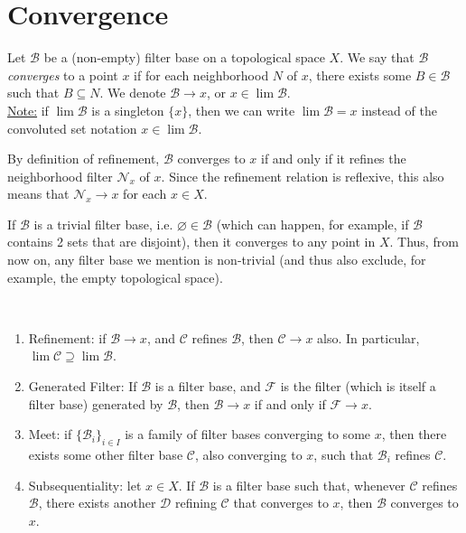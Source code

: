 \documentclass{treatise}
\begin{document}
\newpage

\section{Convergence}
Let $\mathcal{B}$ be a (non-empty) filter base on a topological space $X$. We say that $\mathcal{B}$ \emph{converges} to a point $x$ if for each neighborhood $N$ of $x$, there exists some $B \in \mathcal{B}$ such that $B \subseteq N$. We denote $\mathcal{B} \to x$, or $x \in \lim \mathcal{B}$.
\\
\underline{Note:} if $\lim \mathcal{B}$ is a singleton $\{ x \}$, then we can write $\lim \mathcal{B} = x$ instead of the convoluted set notation $x \in \lim \mathcal{B}$.
\begin{remark}
By definition of refinement, $\mathcal{B}$ converges to $x$ if and only if it refines the neighborhood filter $\mathcal{N}_x$ of $x$. Since the refinement relation is reflexive, this also means that $\mathcal{N}_x \to x$ for each $x \in X$.
\end{remark}
\begin{remark}
If $\mathcal{B}$ is a trivial filter base, i.e. $\varnothing \in \mathcal{B}$ (which can happen, for example, if $\mathcal{B}$ contains 2 sets that are disjoint), then it converges to any point in $X$. Thus, from now on, any filter base we mention is non-trivial (and thus also exclude, for example, the empty topological space).
\end{remark}
\begin{proposition} \label{conv-lat-prop} \ 
\begin{enumerate}
    \item Refinement: if $\mathcal{B} \to x$, and $\mathcal{C}$ refines $\mathcal{B}$, then $\mathcal{C} \to x$ also. In particular, $\lim \mathcal{C} \supseteq \lim \mathcal{B}$.
    \item Generated Filter: If $\mathcal{B}$ is a filter base, and $\mathcal{F}$ is the filter (which is itself a filter base) generated by $\mathcal{B}$, then $\mathcal{B} \to x$ if and only if $\mathcal{F} \to x$.
    \item Meet: if $\{ \mathcal{B}_i \}_{i \in I}$ is a family of filter bases converging to some $x$, then there exists some other filter base $\mathcal{C}$, also converging to $x$, such that $\mathcal{B}_i$ refines $\mathcal{C}$.
    \item Subsequentiality: let $x \in X$. If $\mathcal{B}$ is a filter base such that, whenever $\mathcal{C}$ refines $\mathcal{B}$, there exists another $\mathcal{D}$ refining $\mathcal{C}$ that converges to $x$, then $\mathcal{B}$ converges to $x$.
\end{enumerate}
\end{proposition}
\end{document}
